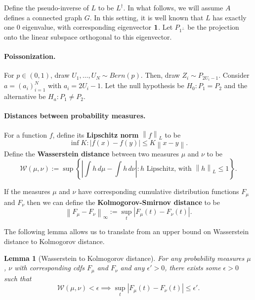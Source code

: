 \documentclass{article}
\newcommand{\norm}[1]{\left\lVert#1\right\rVert}
\newcommand{\abs}[1]{\left \lvert #1 \right \rvert}
\newcommand{\Linv}{L^{\dagger}}
\theoremstyle{alden}
\newtheorem{lemma}{Lemma}
\theoremstyle{definition}
\theoremstyle{remark}
\begin{document}
Define the pseudo-inverse of $L$ to be $\Linv$. In what follows, we will assume $A$ defines a connected graph $G$. In this setting, it is well known that $L$ has exactly one $0$ eigenvalue, with corresponding eigenvector ${\bf 1}$. Let $P_{1^{\perp}}$ be the projection onto the linear subspace orthogonal to this eigenvector.

\paragraph{Poissonization.}

For $p \in (0,1)$, draw $U_1, \ldots, U_{N} \sim Bern(p)$. Then, draw $Z_i \sim P_{2 U_i - 1}$. Consider $a = (a_i)_{i = 1}^{N}$ with $a_i = 2 U_i - 1$. Let the null hypothesis be $H_0: P_1 = P_2$ and the alternative be $H_a: P_1 \neq P_2$.

\paragraph{Distances between probability measures.} 

For a function $f$, define its \textbf{Lipschitz norm} $\norm{f}_{L}$ to be
\begin{equation*}
\inf K : \abs{f(x) - f(y)} \leq K \norm{x - y}.
\end{equation*}
Define the \textbf{Wasserstein distance} between two measures $\mu$ and $\nu$ to be
\begin{equation*}
\mathcal{W}(\mu, \nu) := \sup \left \{ \abs{\int h \, d\mu - \int h \, d\nu}: h \text{ Lipschitz, with } \norm{h}_{L} \leq 1 \right\}.
\end{equation*}

If the measures $\mu$ and $\nu$ have corresponding cumulative distribution functions $F_{\mu}$ and $F_{\nu}$ then we can define the \textbf{Kolmogorov-Smirnov distance} to be
\begin{equation*}
\norm{F_\mu - F_\nu}_{\infty} := \sup_{t} \abs{F_{\mu}(t) - F_{\nu}(t)}.
\end{equation*}


The following lemma allows us to translate from an upper bound on Wasserstein distance to Kolmogorov distance.
\begin{lemma}[Wasserstein to Kolmogorov distance]
	\label{lem: wass_to_ks_distance}
	For any probability measures $\mu$, $\nu$ with corresponding cdfs $F_{\mu}$ and $F_{\nu}$ and any $\epsilon' > 0$, there exists some $\epsilon > 0$ such that
	\begin{equation*}
	\mathcal{W}(\mu, \nu ) < \epsilon \implies \sup_{t} \abs{F_{\mu}(t) - F_{\nu}(t)} \leq \epsilon'.
	\end{equation*}
\end{lemma}
\end{document}
